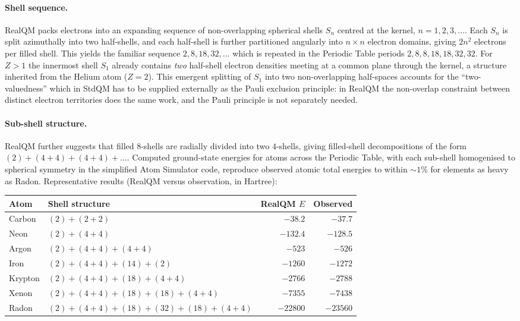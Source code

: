 \documentclass[11pt]{article}
\begin{document}
\paragraph{Shell sequence.}
RealQM packs electrons into an expanding sequence of non-overlapping spherical shells $S_n$ centred at the kernel, $n = 1, 2, 3, \ldots$. Each $S_n$ is split azimuthally into two half-shells, and each half-shell is further partitioned angularly into $n \times n$ electron domains, giving $2 n^2$ electrons per filled shell. This yields the familiar sequence $2, 8, 18, 32, \ldots$ which is repeated in the Periodic Table periods $2, 8, 8, 18, 18, 32, 32$. For $Z > 1$ the innermost shell $S_1$ already contains \emph{two} half-shell electron densities meeting at a common plane through the kernel, a structure inherited from the Helium atom ($Z = 2$). This emergent splitting of $S_1$ into two non-overlapping half-spaces accounts for the ``two-valuedness'' which in StdQM has to be supplied externally as the Pauli exclusion principle: in RealQM the non-overlap constraint between distinct electron territories does the same work, and the Pauli principle is not separately needed.

\paragraph{Sub-shell structure.}
RealQM further suggests that filled $8$-shells are radially divided into two $4$-shells, giving filled-shell decompositions of the form $(2) + (4{+}4) + (4{+}4) + \ldots$. Computed ground-state energies for atoms across the Periodic Table, with each sub-shell homogenised to spherical symmetry in the simplified Atom Simulator code, reproduce observed atomic total energies to within ${\sim}1\%$ for elements as heavy as Radon. Representative results (RealQM versus observation, in Hartree):

\begin{center}\small
\renewcommand{\arraystretch}{1.05}
\begin{tabular}{l l r r}
\toprule
\textbf{Atom} & \textbf{Shell structure} & \textbf{RealQM $E$} & \textbf{Observed} \\
\midrule
Carbon   & $(2) + (2{+}2)$                                  & $-38.2$    & $-37.7$    \\
Neon     & $(2) + (4{+}4)$                                  & $-132.4$   & $-128.5$   \\
Argon    & $(2) + (4{+}4) + (4{+}4)$                        & $-523$     & $-526$     \\
Iron     & $(2) + (4{+}4) + (14) + (2)$                     & $-1260$    & $-1272$    \\
Krypton  & $(2) + (4{+}4) + (18) + (4{+}4)$                 & $-2766$    & $-2788$    \\
Xenon    & $(2) + (4{+}4) + (18) + (18) + (4{+}4)$          & $-7355$    & $-7438$    \\
Radon    & $(2) + (4{+}4) + (18) + (32) + (18) + (4{+}4)$   & $-22800$   & $-23560$   \\
\bottomrule
\end{tabular}
\end{center}
\end{document}
